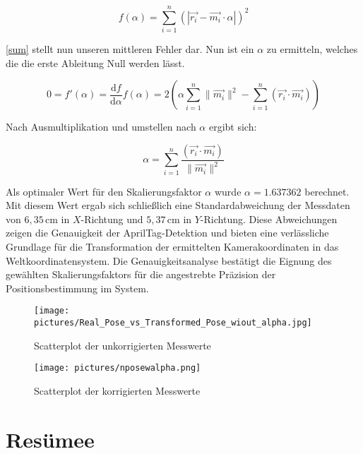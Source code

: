 \documentclass[ngerman]{article}    %
\theoremstyle{definition}
\begin{document}
\begin{equation} \label{sum}
    f(\alpha) =  \sum_{ i=1 }^{ n }(|\vec{r_i} - \vec{m_i} \cdot \alpha|)^2 
\end{equation}

\autoref{sum} stellt nun unseren mittleren Fehler dar. Nun ist ein \(\alpha\) zu ermitteln, welches die die erste Ableitung Null werden lässt.

\begin{equation}
    0 = f'(\alpha) = \frac{\text{d}f}{\text{d}\alpha} f(\alpha) = 2\left(\alpha \sum_{i=1}^{n} \|\vec{m_i}\|^2 - \sum_{i=1}^{n} (\vec{r_i} \cdot \vec{m_i})\right)
\end{equation}

Nach Ausmultiplikation und umstellen nach \(\alpha\) ergibt sich:

\begin{equation}
    \alpha = \sum_{i=1}^{n} \frac{ (\vec{r_i} \cdot \vec{m_i})}{ \|\vec{m_i}\|^2}
\end{equation}

Als optimaler Wert für den Skalierungsfaktor \(\alpha\) wurde \(\alpha = 1.637362\) berechnet. Mit diesem Wert ergab sich schließlich eine Standardabweichung der Messdaten von \(6,35 \, \text{cm}\) in \(X\)-Richtung und \(5,37 \, \text{cm}\) in \(Y\)-Richtung. Diese Abweichungen zeigen die Genauigkeit der AprilTag-Detektion und bieten eine verlässliche Grundlage für die Transformation der ermittelten Kamerakoordinaten in das Weltkoordinatensystem. Die Genauigkeitsanalyse bestätigt die Eignung des gewählten Skalierungsfaktors für die angestrebte Präzision der Positionsbestimmung im System.

\begin{figure}[htb]
    \centering
    \texttt{[image: pictures/Real\_Pose\_vs\_Transformed\_Pose\_wiout\_alpha.jpg]}
    \caption{Scatterplot der unkorrigierten Messwerte}
    \label{fig:plotwoutalpha}
\end{figure}

\begin{figure}[hb]
    \centering
    \texttt{[image: pictures/nposewalpha.png]}
    \caption{Scatterplot der korrigierten Messwerte}
    \label{fig:plotwalpha}
\end{figure}

\FloatBarrier

\newpage

\section{Resümee}
\end{document}
